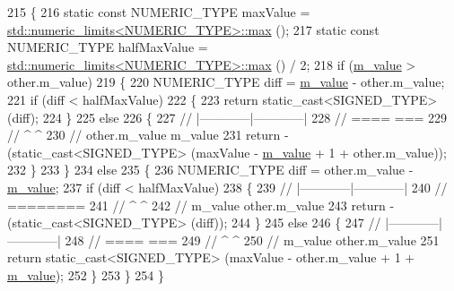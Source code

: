 {\begin{DoxyCode}
215   \{
216     \textcolor{keyword}{static} \textcolor{keyword}{const} NUMERIC\_TYPE maxValue = \hyperlink{80211b_8c_affe776513b24d84b39af8ab0930fef7f}{std::numeric\_limits<NUMERIC\_TYPE>::max}
       ();
217     \textcolor{keyword}{static} \textcolor{keyword}{const} NUMERIC\_TYPE halfMaxValue = 
      \hyperlink{80211b_8c_affe776513b24d84b39af8ab0930fef7f}{std::numeric\_limits<NUMERIC\_TYPE>::max} () / 2;
218     \textcolor{keywordflow}{if} (\hyperlink{classns3_1_1SequenceNumber_adf80ab2f164cf0e6aa3f8c00b8e4aa91}{m\_value} > other.m\_value)
219       \{
220         NUMERIC\_TYPE diff = \hyperlink{classns3_1_1SequenceNumber_adf80ab2f164cf0e6aa3f8c00b8e4aa91}{m\_value} - other.m\_value;
221         \textcolor{keywordflow}{if} (diff < halfMaxValue)
222           \{
223             \textcolor{keywordflow}{return} \textcolor{keyword}{static\_cast<}SIGNED\_TYPE\textcolor{keyword}{>} (diff);
224           \}
225         \textcolor{keywordflow}{else}
226           \{
227             \textcolor{comment}{//      |------------|------------|}
228             \textcolor{comment}{//       ====                  ===}
229             \textcolor{comment}{//          ^                  ^}
230             \textcolor{comment}{//       other.m\_value      m\_value}
231             \textcolor{keywordflow}{return} -(\textcolor{keyword}{static\_cast<}SIGNED\_TYPE\textcolor{keyword}{>} (maxValue - \hyperlink{classns3_1_1SequenceNumber_adf80ab2f164cf0e6aa3f8c00b8e4aa91}{m\_value} + 1 + other.m\_value));
232           \}
233       \}
234     \textcolor{keywordflow}{else}
235       \{
236         NUMERIC\_TYPE diff = other.m\_value - \hyperlink{classns3_1_1SequenceNumber_adf80ab2f164cf0e6aa3f8c00b8e4aa91}{m\_value};
237         \textcolor{keywordflow}{if} (diff < halfMaxValue)
238           \{
239             \textcolor{comment}{//      |------------|------------|}
240             \textcolor{comment}{//          ========}
241             \textcolor{comment}{//          ^      ^}
242             \textcolor{comment}{//     m\_value   other.m\_value}
243             \textcolor{keywordflow}{return} -(\textcolor{keyword}{static\_cast<}SIGNED\_TYPE\textcolor{keyword}{>} (diff));
244           \}
245         \textcolor{keywordflow}{else}
246           \{
247             \textcolor{comment}{//      |------------|------------|}
248             \textcolor{comment}{//       ====                  ===}
249             \textcolor{comment}{//          ^                  ^}
250             \textcolor{comment}{//       m\_value      other.m\_value}
251             \textcolor{keywordflow}{return} \textcolor{keyword}{static\_cast<}SIGNED\_TYPE\textcolor{keyword}{>} (maxValue - other.m\_value + 1 + 
      \hyperlink{classns3_1_1SequenceNumber_adf80ab2f164cf0e6aa3f8c00b8e4aa91}{m\_value});
252           \}
253       \}
254   \}
\end{DoxyCode}
}
